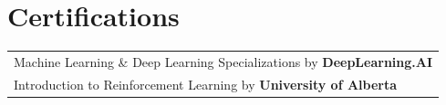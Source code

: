 \documentclass[a4paper,9pt]{extarticle}
\begin{document}
\section{Certifications}
\begin{tabularx}{\linewidth}{@{}X@{}}	
Machine Learning \& Deep Learning Specializations by \textbf{DeepLearning.AI} \\
Introduction to Reinforcement Learning by \textbf{University of Alberta} \\
\end{tabularx}









\end{document}
